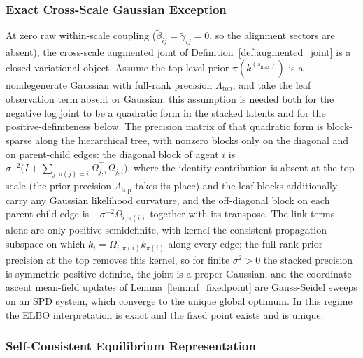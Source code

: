 \documentclass[11pt]{article}
\begin{document}
\subsubsection{Exact Cross-Scale Gaussian Exception}

At zero raw within-scale coupling ($\tilde\beta_{ij}=\tilde\gamma_{ij}=0$, so the alignment sectors are absent), the cross-scale augmented joint of Definition~\ref{def:augmented_joint} is a closed variational object. Assume the top-level prior $\pi(k^{(s_{\max})})$ is a nondegenerate Gaussian with full-rank precision $\Lambda_{\mathrm{top}}$, and take the leaf observation term absent or Gaussian; this assumption is needed both for the negative log joint to be a quadratic form in the stacked latents and for the positive-definiteness below. The precision matrix of that quadratic form is block-sparse along the hierarchical tree, with nonzero blocks only on the diagonal and on parent-child edges: the diagonal block of agent $i$ is $\sigma^{-2}\big(I + \sum_{j : \pi(j) = i}\Omega_{j,i}^\top\Omega_{j,i}\big)$, where the identity contribution is absent at the top scale (the prior precision $\Lambda_{\mathrm{top}}$ takes its place) and the leaf blocks additionally carry any Gaussian likelihood curvature, and the off-diagonal block on each parent-child edge is $-\sigma^{-2}\Omega_{i,\pi(i)}$ together with its transpose. The link terms alone are only positive semidefinite, with kernel the consistent-propagation subspace on which $k_i = \Omega_{i,\pi(i)}k_{\pi(i)}$ along every edge; the full-rank prior precision at the top removes this kernel, so for finite $\sigma^2 > 0$ the stacked precision is symmetric positive definite, the joint is a proper Gaussian, and the coordinate-ascent mean-field updates of Lemma~\ref{lem:mf_fixedpoint} are Gauss-Seidel sweeps on an SPD system, which converge to the unique global optimum. In this regime the ELBO interpretation is exact and the fixed point exists and is unique.

\subsubsection{Self-Consistent Equilibrium Representation}
\end{document}
